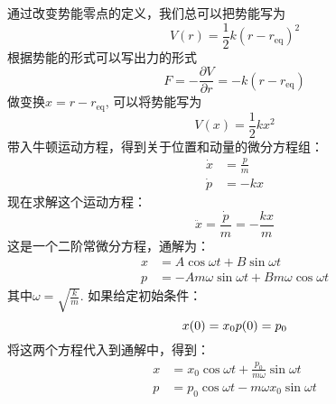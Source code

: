     通过改变势能零点的定义，我们总可以把势能写为
    \begin{equation}
        V(r) = \frac{1}{2}k(r-r_\mathrm{eq})^2
    \end{equation}
    根据势能的形式可以写出力的形式
    \begin{equation}
        F = -\frac {\partial V}{\partial r} = -k(r-r_\mathrm{eq})
    \end{equation}
    做变换$x = r - r_\mathrm{eq}$, 可以将势能写为
    \begin{equation}
        V(x) = \frac 12 kx^2
    \end{equation}
    带入牛顿运动方程，得到关于位置和动量的微分方程组：
    \begin{equation}
        \begin{split}
            \dot{x} &= \frac pm\\
            \dot{p} &= -kx
        \end{split}
    \end{equation}
    现在求解这个运动方程：
    \begin{equation}
        \ddot{x} = \frac {\dot{p}}m = -\frac {kx}{m}
    \end{equation}
    这是一个二阶常微分方程，通解为：
    \begin{equation}
        \begin{split}
            x &= A \cos{\omega t} + B \sin{\omega t}\\
            p &= -{Am\omega} \sin{\omega t} + {Bm \omega} \cos{\omega t}
        \end{split}
    \end{equation}
    其中$\omega = \sqrt{\frac km}$. 如果给定初始条件：
    \begin{equation}
        x(0) = x_0\\
        p(0) = p_0
    \end{equation}
    将这两个方程代入到通解中，得到：
    \begin{equation}
        \begin{split}
            x &= x_0 \cos{\omega t} + \frac {p_0}{m\omega} \sin{\omega t}\\
            p &= p_0 \cos{\omega t} - {m\omega x_0} \sin{\omega t}
        \end{split}
    \end{equation}
